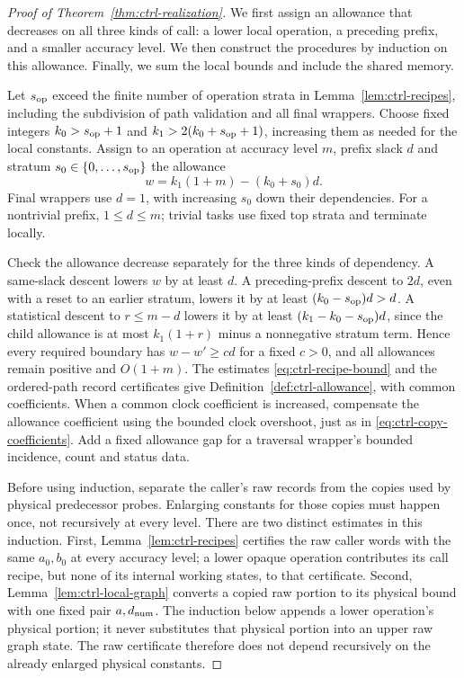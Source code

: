 \documentclass[11pt]{article}
\numberwithin{equation}{section}
\theoremstyle{definition}
\theoremstyle{remark}
\begin{document}
\begin{proof}[Proof of Theorem~\ref{thm:ctrl-realization}]
We first assign an allowance that decreases on all three kinds of call: a lower local operation, a preceding prefix, and a smaller accuracy level. We then construct the procedures by induction on this allowance. Finally, we sum the local bounds and include the shared memory.

Let ${s_{\rm op}}$ exceed the finite number of operation strata in
Lemma~\ref{lem:ctrl-recipes}, including the subdivision of path
validation and all final wrappers.  Choose fixed integers
${k}_0>{s_{\rm op}}+1$ and ${k}_1>2({k}_0+{s_{\rm op}}+1)$, increasing them as needed for the
local constants.  Assign to an operation at accuracy level ${m}$, prefix slack
$d$ and stratum $s_0\in\{0,\ldots,{s_{\rm op}}\}$ the allowance
\begin{equation}\label{eq:ctrl-allowance-formula}
 w={k}_1(1+{m})-({k}_0+s_0)d.
\end{equation}
Final wrappers use $d=1$, with increasing $s_0$ down their dependencies.
For a nontrivial prefix, $1\le d\le {m}$; trivial tasks use fixed top
strata and terminate locally.

Check the allowance decrease separately for the three kinds of dependency. A same-slack descent lowers $w$ by at least $d$.  A preceding-prefix
descent to $2d$, even with a reset to an earlier stratum, lowers it by
at least $({k}_0-{s_{\rm op}})d>d$.  A statistical descent to ${r}\le {m}-d$ lowers it
by at least $({k}_1-{k}_0-{s_{\rm op}})d$, since the child allowance is at most
${k}_1(1+{r})$ minus a nonnegative stratum term.  Hence every required
boundary has $w-w'\ge c d$ for a fixed $c>0$, and all allowances remain
positive and $O(1+{m})$.  The estimates
\eqref{eq:ctrl-recipe-bound} and the ordered-path record certificates
give Definition~\ref{def:ctrl-allowance}, with common coefficients.
When a common clock coefficient is increased, compensate the allowance
coefficient using the bounded clock overshoot, just as in
\eqref{eq:ctrl-copy-coefficients}.  Add a fixed allowance gap for a
traversal wrapper's bounded incidence, count and status data.

Before using induction, separate the caller's raw records from the copies used by physical predecessor probes. Enlarging constants for those copies must happen once, not recursively at every level. There are two distinct estimates in this induction.  First,
Lemma~\ref{lem:ctrl-recipes} certifies the raw caller words with the same
$a_0,b_0$ at every accuracy level; a lower opaque operation contributes its call
recipe, but none of its internal working states, to that certificate.
Second, Lemma~\ref{lem:ctrl-local-graph} converts a copied raw portion to
its physical bound with one fixed pair ${a},{d_{\rm num}}$.  The induction below
appends a lower operation's physical portion; it never substitutes that
physical portion into an upper raw graph state.  The raw certificate
therefore does not depend recursively on the already enlarged physical
constants.


\end{proof}
\end{document}
